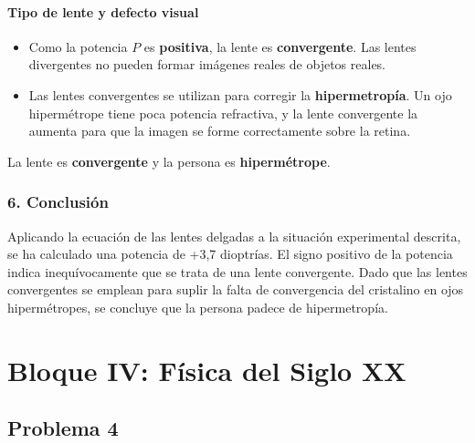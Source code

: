 \paragraph*{Tipo de lente y defecto visual}
\begin{itemize}
    \item Como la potencia $P$ es \textbf{positiva}, la lente es \textbf{convergente}. Las lentes divergentes no pueden formar imágenes reales de objetos reales.
    \item Las lentes convergentes se utilizan para corregir la \textbf{hipermetropía}. Un ojo hipermétrope tiene poca potencia refractiva, y la lente convergente la aumenta para que la imagen se forme correctamente sobre la retina.
\end{itemize}
\begin{cajaresultado}
    La lente es \textbf{convergente} y la persona es \textbf{hipermétrope}.
\end{cajaresultado}

\subsubsection*{6. Conclusión}
\begin{cajaconclusion}
Aplicando la ecuación de las lentes delgadas a la situación experimental descrita, se ha calculado una potencia de +3,7 dioptrías. El signo positivo de la potencia indica inequívocamente que se trata de una lente convergente. Dado que las lentes convergentes se emplean para suplir la falta de convergencia del cristalino en ojos hipermétropes, se concluye que la persona padece de hipermetropía.
\end{cajaconclusion}

\newpage

\section{Bloque IV: Física del Siglo XX}
\label{sec:fisXX_2022_jul_ord}

\subsection{Problema 4}
\label{subsec:P4_2022_jul_ord}

